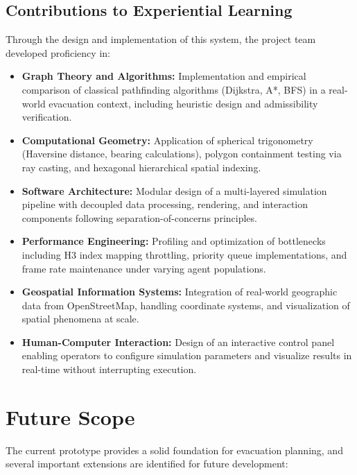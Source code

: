 \documentclass[12pt,a4paper,oneside]{report}
\begin{document}
\subsection{Contributions to Experiential Learning}
Through the design and implementation of this system, the project team developed proficiency in:
\begin{itemize}
    \item \textbf{Graph Theory and Algorithms:} Implementation and empirical comparison of classical pathfinding algorithms (Dijkstra, A*, BFS) in a real-world evacuation context, including heuristic design and admissibility verification.
    
    \item \textbf{Computational Geometry:} Application of spherical trigonometry (Haversine distance, bearing calculations), polygon containment testing via ray casting, and hexagonal hierarchical spatial indexing.
    
    \item \textbf{Software Architecture:} Modular design of a multi-layered simulation pipeline with decoupled data processing, rendering, and interaction components following separation-of-concerns principles.
    
    \item \textbf{Performance Engineering:} Profiling and optimization of bottlenecks including H3 index mapping throttling, priority queue implementations, and frame rate maintenance under varying agent populations.
    
    \item \textbf{Geospatial Information Systems:} Integration of real-world geographic data from OpenStreetMap, handling coordinate systems, and visualization of spatial phenomena at scale.
    
    \item \textbf{Human-Computer Interaction:} Design of an interactive control panel enabling operators to configure simulation parameters and visualize results in real-time without interrupting execution.
\end{itemize}

\section{Future Scope}
The current prototype provides a solid foundation for evacuation planning, and several important extensions are identified for future development:
\end{document}
